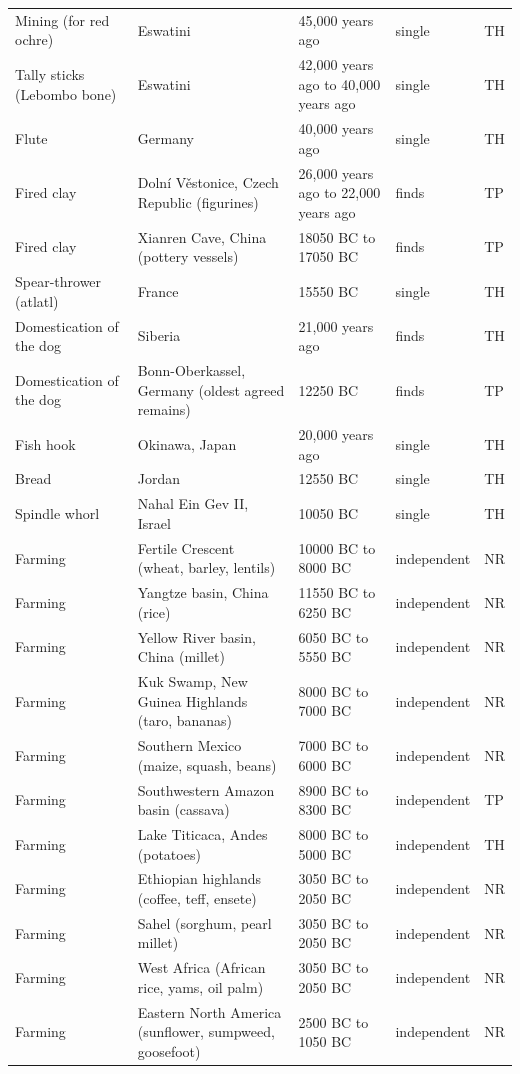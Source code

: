 \documentclass[11pt,a4paper]{article}
\begin{document}
\begin{longtable}{p{3.3cm}p{5.2cm}p{3.3cm}p{1.7cm}l}
Mining (for red ochre) & Eswatini & 45,000 years ago & single & TH\\
Tally sticks (Lebombo bone) & Eswatini & 42,000 years ago to 40,000 years ago & single & TH\\
Flute & Germany & 40,000 years ago & single & TH\\
Fired clay & Dolní Věstonice, Czech Republic (figurines) & 26,000 years ago to 22,000 years ago & finds & TP\\
Fired clay & Xianren Cave, China (pottery vessels) & 18050 BC to 17050 BC & finds & TP\\
Spear-thrower (atlatl) & France & 15550 BC & single & TH\\
Domestication of the dog & Siberia & 21,000 years ago & finds & TH\\
Domestication of the dog & Bonn-Oberkassel, Germany (oldest agreed remains) & 12250 BC & finds & TP\\
Fish hook & Okinawa, Japan & 20,000 years ago & single & TH\\
Bread & Jordan & 12550 BC & single & TH\\
Spindle whorl & Nahal Ein Gev II, Israel & 10050 BC & single & TH\\
Farming & Fertile Crescent (wheat, barley, lentils) & 10000 BC to 8000 BC & independent & NR\\
Farming & Yangtze basin, China (rice) & 11550 BC to 6250 BC & independent & NR\\
Farming & Yellow River basin, China (millet) & 6050 BC to 5550 BC & independent & NR\\
Farming & Kuk Swamp, New Guinea Highlands (taro, bananas) & 8000 BC to 7000 BC & independent & NR\\
Farming & Southern Mexico (maize, squash, beans) & 7000 BC to 6000 BC & independent & NR\\
Farming & Southwestern Amazon basin (cassava) & 8900 BC to 8300 BC & independent & TP\\
Farming & Lake Titicaca, Andes (potatoes) & 8000 BC to 5000 BC & independent & TH\\
Farming & Ethiopian highlands (coffee, teff, ensete) & 3050 BC to 2050 BC & independent & NR\\
Farming & Sahel (sorghum, pearl millet) & 3050 BC to 2050 BC & independent & NR\\
Farming & West Africa (African rice, yams, oil palm) & 3050 BC to 2050 BC & independent & NR\\
Farming & Eastern North America (sunflower, sumpweed, goosefoot) & 2500 BC to 1050 BC & independent & NR\\

\end{longtable}
\end{document}
